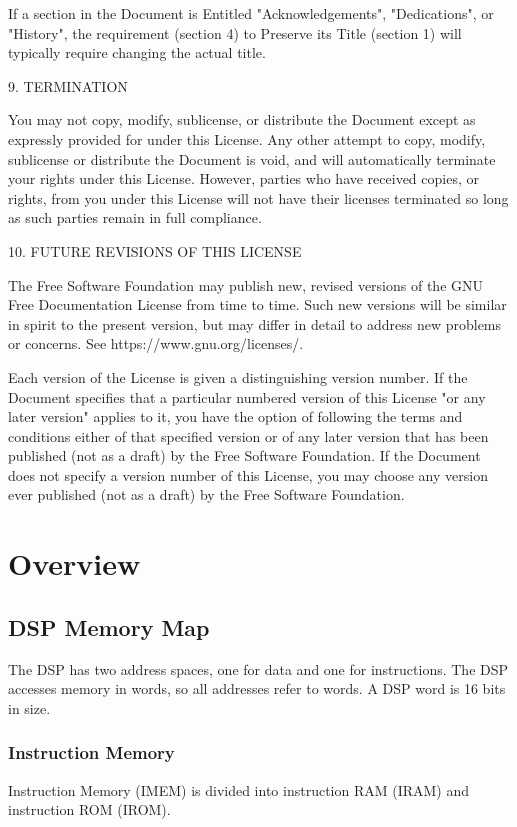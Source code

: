 \documentclass[oneside,english,a4paper,10pt,oneside,openany,final]{memoir}
\begin{document}
If a section in the Document is Entitled "Acknowledgements", "Dedications", or "History", the requirement (section 4) to Preserve its Title (section 1) will typically require changing the actual title.

9. TERMINATION

You may not copy, modify, sublicense, or distribute the Document except as expressly provided for under this License. Any other attempt to copy, modify, sublicense or distribute the Document is void, and will automatically terminate your rights under this License. However, parties who have received copies, or rights, from you under this License will not have their licenses terminated so long as such parties remain in full compliance.

10. FUTURE REVISIONS OF THIS LICENSE

The Free Software Foundation may publish new, revised versions of the GNU Free Documentation License from time to time. Such new versions will be similar in spirit to the present version, but may differ in detail to address new problems or concerns. See https://www.gnu.org/licenses/.

Each version of the License is given a distinguishing version number. If the Document specifies that a particular numbered version of this License "or any later version" applies to it, you have the option of following the terms and conditions either of that specified version or of any later version that has been published (not as a draft) by the Free Software Foundation. If the Document does not specify a version number of this License, you may choose any version ever published (not as a draft) by the Free Software Foundation.

\pagebreak{}

\chapter{Overview}

\section{DSP Memory Map}

The DSP has two address spaces, one for data and one for instructions.  The DSP accesses memory in words, so all addresses refer to words. A DSP word is 16 bits in size.

\subsection{Instruction Memory}
Instruction Memory (IMEM) is divided into instruction RAM (IRAM) and instruction ROM (IROM).
\end{document}
